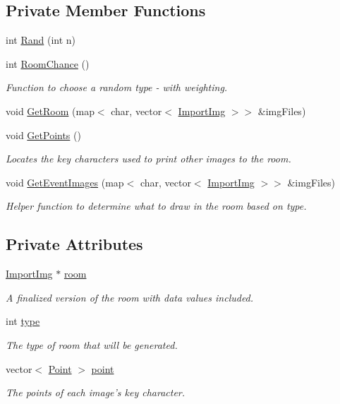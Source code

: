 \subsection*{Private Member Functions}
\begin{DoxyCompactItemize}
\item 
int \hyperlink{classRoom_aebcb2b6bf73c7a2592a1e5c5d02b40ce}{Rand} (int n)
\item 
int \hyperlink{classRoom_aa44d19f37e62cbf130727c7aa3be0757}{Room\-Chance} ()
\begin{DoxyCompactList}\small\item\em Function to choose a random type -\/ with weighting. \end{DoxyCompactList}\item 
void \hyperlink{classRoom_ad791cbeff004df5ae7c8655f85e540ae}{Get\-Room} (map$<$ char, vector$<$ \hyperlink{classImportImg}{Import\-Img} $>$$>$ \&img\-Files)
\item 
void \hyperlink{classRoom_a15f3f815f6d41e61e7e12465994fa185}{Get\-Points} ()
\begin{DoxyCompactList}\small\item\em Locates the key characters used to print other images to the room. \end{DoxyCompactList}\item 
void \hyperlink{classRoom_a3e33111e62068e4ae0fef5b17a1f1841}{Get\-Event\-Images} (map$<$ char, vector$<$ \hyperlink{classImportImg}{Import\-Img} $>$$>$ \&img\-Files)
\begin{DoxyCompactList}\small\item\em Helper function to determine what to draw in the room based on type. \end{DoxyCompactList}\end{DoxyCompactItemize}
\subsection*{Private Attributes}
\begin{DoxyCompactItemize}
\item 
\hyperlink{classImportImg}{Import\-Img} $\ast$ \hyperlink{classRoom_a4d493bf25d07a6880b399adedd3a10e6}{room}
\begin{DoxyCompactList}\small\item\em A finalized version of the room with data values included. \end{DoxyCompactList}\item 
int \hyperlink{classRoom_a209eba22dbc85cb190906de3f0363e59}{type}
\begin{DoxyCompactList}\small\item\em The type of room that will be generated. \end{DoxyCompactList}\item 
vector$<$ \hyperlink{structRoom_1_1Point}{Point} $>$ \hyperlink{classRoom_aa5729228bac2fa43e1317655ec6dc5b7}{point}
\begin{DoxyCompactList}\small\item\em The points of each image's key character. \end{DoxyCompactList}\end{DoxyCompactItemize}


